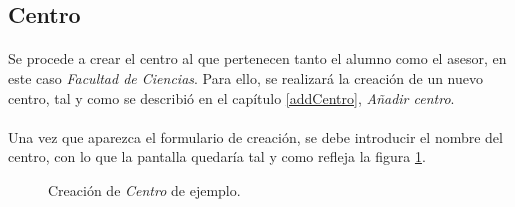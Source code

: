 \subsection{Centro}

  \paragraph{}Se procede a crear el centro al que pertenecen tanto el alumno
  como el asesor, en este caso \textit{Facultad de Ciencias}. Para ello, se
  realizará la creación de un nuevo centro, tal y como se describió en el
  capítulo \ref{addCentro}, \textit{Añadir centro}.

  \paragraph{}Una vez que aparezca el formulario de creación, se debe introducir
  el nombre del centro, con lo que la pantalla quedaría tal y como refleja la
  figura \ref{ejemploAddCentro}.

  \begin{figure}[!ht]
    \begin{center}
      \caption{Creación de \textit{Centro} de ejemplo.}
      \label{ejemploAddCentro}
    \end{center}
  \end{figure}
